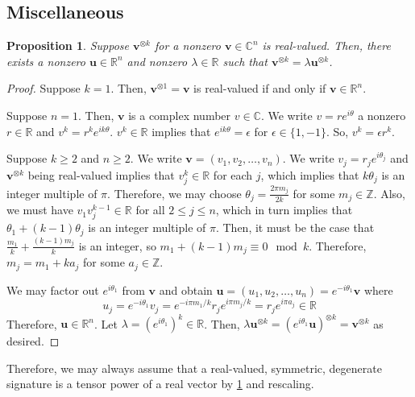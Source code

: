 \documentclass[11pt]{article}
\newtheorem{proposition}[theorem]{Proposition}
\begin{document}
\subsection{Miscellaneous}
\begin{proposition}\label{prop:real-degenerate-real-vector}
  Suppose $\mathbf{v}^{\otimes k}$ for a nonzero $\mathbf{v} \in \mathbb{C}^n$ is real-valued.
  Then, there exists a nonzero $\mathbf{u} \in \mathbb{R}^n$ and nonzero $\lambda \in \mathbb{R}$ such that $\mathbf{v}^{\otimes k} = \lambda \mathbf{u}^{\otimes k}$.
\end{proposition}
\begin{proof}
  Suppose $k = 1$.
  Then, $\mathbf{v}^{\otimes 1} = \mathbf{v}$ is real-valued if and only if $\mathbf{v} \in \mathbb{R}^n$.

  Suppose $n = 1$.
  Then, $\mathbf{v}$ is a complex number $v \in \mathbb{C}$.
  We write $v = r e^{i\theta}$ a nonzero $r \in \mathbb{R}$ and $v^k = r^k e^{i k \theta}$.
  $v^k \in \mathbb{R}$ implies that $e^{i k \theta} = \epsilon$ for $\epsilon \in \{1, -1\}$.
  So, $v^k = \epsilon r^k$.

  Suppose $k \ge 2$ and $n \ge 2$.
  We write $\mathbf{v} = (v_1, v_2, \ldots, v_n)$.
  We write $v_j = r_j e^{i \theta_j}$ and 
  $\mathbf{v}^{\otimes k}$ being real-valued implies that $v_j^k \in \mathbb{R}$ for each $j$, which implies that $k \theta_j$ is an integer multiple of $\pi$.
  Therefore, we may choose $\theta_j = \frac{2 \pi m_j}{2k}$ for some $m_j \in \mathbb{Z}$.
  Also, we must have $v_1 v_j^{k-1} \in \mathbb{R}$ for all $2 \le j \le n$, which in turn implies that $\theta_1 + (k-1)\theta_j$ is an integer multiple of $\pi$.
  Then, it must be the case that $\frac{m_1}{k} + \frac{(k-1)m_j}{k}$ is an integer, so $m_1 + (k-1) m_j \equiv 0 \mod k$.
  Therefore, $m_j = m_1 + k a_j$ for some $a_j \in \mathbb{Z}$.

  We may factor out $e^{i \theta_1}$ from $\mathbf{v}$ and obtain $\mathbf{u} = (u_1, u_2, \ldots, u_n) = e^{-i \theta_1} \mathbf{v}$ where
  \[
    u_j = e^{-i \theta_1} v_j = e^{-i \pi m_1/k} r_j e^{i \pi m_j/k} = r_j e^{i \pi a_j} \in \mathbb{R}
  \]
  Therefore, $\mathbf{u} \in \mathbb{R}^n$.
  Let $\lambda = (e^{i \theta_1})^k \in \mathbb{R}$.
  Then, $\lambda \mathbf{u}^{\otimes k} = (e^{i \theta_1} \mathbf{u})^{\otimes k} = \mathbf{v}^{\otimes k}$ as desired.
\end{proof}
Therefore, we may always assume that a real-valued, symmetric, degenerate signature is a tensor power of a real vector by \cref{prop:real-degenerate-real-vector} and rescaling.
\end{document}
